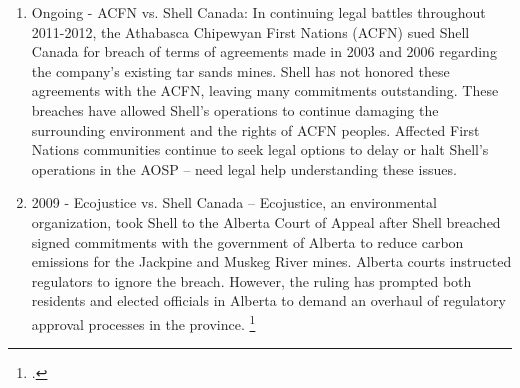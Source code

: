 \begin{enumerate}
	\item Ongoing - ACFN vs. Shell Canada: In continuing legal battles throughout 2011-2012, the Athabasca Chipewyan First Nations (ACFN) sued Shell Canada for breach of terms of agreements made in 2003 and 2006 regarding the company’s existing tar sands mines. Shell has not honored these agreements with the ACFN, leaving many commitments outstanding. These breaches have allowed Shell’s operations to continue damaging the surrounding environment and the rights of ACFN peoples. Affected First Nations communities continue to seek legal options to delay or halt Shell’s operations in the AOSP – need legal help understanding these issues.
	\item 2009 - Ecojustice vs. Shell Canada – Ecojustice, an environmental organization, took Shell to the Alberta Court of Appeal after Shell breached signed commitments with the government of Alberta to reduce carbon emissions for the Jackpine and Muskeg River mines. Alberta courts instructed regulators to ignore the breach. However, the ruling has prompted both residents and elected officials in Alberta to demand an overhaul of regulatory approval processes in the province. \footcite[][]{RiskingRuin_2012}

\end{enumerate}
